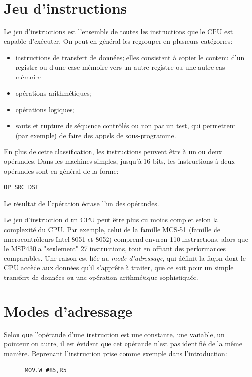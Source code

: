 \section{Jeu d'instructions}
Le jeu d'instructions est l'ensemble de toutes les instructions que le CPU est capable d'exécuter. On peut en général les regrouper en plusieurs catégories:
\begin{itemize}[label=\textbullet,font=\small]
\item instructions de transfert de données; elles consistent à copier le contenu d'un registre ou d'une case mémoire vers un autre registre ou une autre cas mémoire.
\item opérations arithmétiques;
\item opérations logiques;
\item sauts et rupture de séquence contrôlés ou non par un test, qui permettent (par exemple) de faire des appels de sous-programme.
\end{itemize}

En plus de cette classification, les instructions peuvent être à un ou deux opérandes. Dans les machines simples, jusqu'à 16-bits, les instructions à deux opérandes sont en général de la forme:
\lstset{style=customc}
\begin{lstlisting}
OP SRC DST
\end{lstlisting}
Le résultat de l'opération écrase l'un des opérandes.

\bigskip
Le jeu d'instruction d'un CPU peut être plus ou moins complet selon la complexité du CPU. Par exemple, celui de la famille MCS-51 (famille de microcontrôleurs Intel 8051 et 8052) comprend environ 110 instructions, alors que le MSP430 a "seulement" 27 instructions, tout en offrant des performances comparables.
Une raison est liée au \textit{mode d'adressage}, qui définit la façon dont le CPU accède aux données qu'il s'apprête à traiter, que ce soit pour un simple transfert de données ou une opération arithmétique sophistiquée.

\section{Modes d'adressage}
Selon que l'opérande d'une instruction est une constante, une variable, un pointeur ou autre, il est évident que cet opérande n'est pas identifié de la même manière.
Reprenant l'instruction prise comme exemple dans l'introduction:
\lstset{style=customc}
\begin{lstlisting}
      MOV.W #85,R5
\end{lstlisting}


